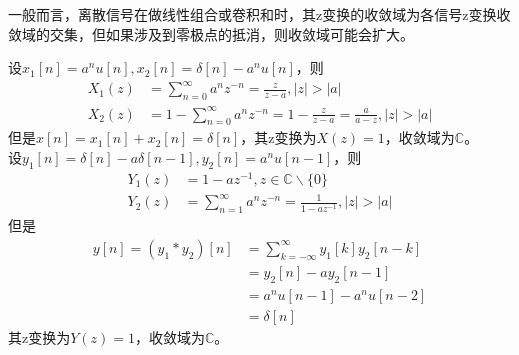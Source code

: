 一般而言，离散信号在做线性组合或卷积和时，其z变换的收敛域为各信号z变换收敛域的交集，但如果涉及到零极点的抵消，则收敛域可能会扩大。
\begin{example}[收敛域的扩张]
    设$x_1[n]=a^{n}u[n],x_2[n]=\delta[n]-a^{n}u[n]$，则
    \begin{align*}
        X_1(z)&=\sum_{n=0}^{\infty}a^{n}z^{-n}=\frac{z}{z-a},|z|>|a|\\
        X_2(z)&=1-\sum_{n=0}^{\infty}a^{n}z^{-n}=1-\frac{z}{z-a}=\frac{a}{a-z},|z|>|a|
    \end{align*}
    但是$x[n]=x_1[n]+x_2[n]=\delta[n]$，其z变换为$X(z)=1$，收敛域为$\mathbb{C}$。\\
    设$y_1[n]=\delta[n]-a\delta[n-1],y_2[n]=a^{n}u[n-1]$，则
    \begin{align*}
        Y_1(z)&=1-a z^{-1},z\in\mathbb{C}\backslash\{0\}\\
        Y_2(z)&=\sum_{n=1}^{\infty}a^{n}z^{-n}=\frac{1}{1-a z^{-1}},|z|>|a|
    \end{align*}
    但是\begin{align*}
        y[n]=\left(y_1*y_2\right)[n]&=\sum_{k=-\infty}^{\infty}y_1[k]y_2[n-k]\\
        &=y_2[n]-a y_2[n-1]\\
        &=a^{n}u[n-1]-a^{n}u[n-2]\\
        &=\delta[n]
    \end{align*}
    其z变换为$Y(z)=1$，收敛域为$\mathbb{C}$。
\end{example}
